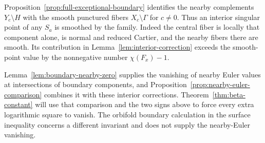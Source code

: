 Proposition~\ref{prop:full-exceptional-boundary} identifies the nearby
complements $Y_c\setminus H$ with the smooth punctured fibers
$X_c\setminus\Gamma$ for $c\ne0$.  Thus an interior singular point
of any $S_a$ is smoothed by the family.  Indeed the central fiber is locally that component alone, is
normal and reduced Cartier, and the nearby fibers there are smooth.  Its
contribution in Lemma~\ref{lem:interior-correction} exceeds the smooth-point
value by the nonnegative number $\chi(F_x)-1$.

Lemma~\ref{lem:boundary-nearby-zero} supplies the vanishing of nearby
Euler values at intersections of boundary components, and
Proposition~\ref{prop:nearby-euler-comparison} combines it with these
interior corrections.  Theorem~\ref{thm:beta-constant} will use that
comparison and the two signs above to force every extra logarithmic square
to vanish.  The orbifold boundary calculation in the surface inequality
concerns a different invariant and does not supply the nearby-Euler
vanishing.
